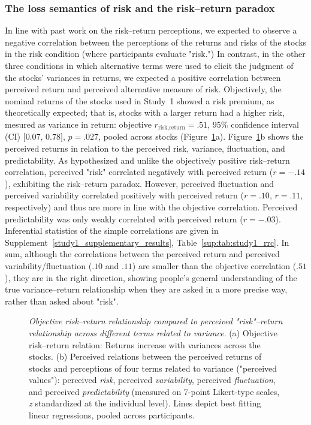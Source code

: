 \documentclass[a4paper,man, natbib,floatsintext]{apa6} %
\begin{document}
\subsubsection{The loss semantics of risk and the risk--return paradox}
In line with past work on the risk--return perceptions, we expected to observe a negative correlation between the perceptions of the returns and risks of the stocks in the risk condition (where participants evaluate "risk.") In contrast, in the other three conditions in which alternative terms were used to elicit the judgment of the stocks' variances in returns, we expected a positive correlation between perceived return and perceived alternative measure of risk. Objectively, the nominal returns of the stocks used in Study~1 showed a risk premium, as theoretically expected; that is, stocks with a larger return had a higher risk, mesured as variance in return: objective $r_{\text{risk,return}} = .51$, 95\% confidence interval (CI) $[0.07$, $0.78]$, $p = .027$, pooled across stocks (Figure~\ref{fig:rrc}a). Figure~\ref{fig:rrc}b shows the perceived returns in relation to the perceived risk, variance, fluctuation, and predictability. As hypothesized and unlike the objectively positive risk--return correlation, perceived "risk" correlated negatively with perceived return ($r = -.14$), exhibiting the risk--return paradox. However, perceived fluctuation and perceived variability correlated positively with perceived return ($r = .10$, $r = .11$, respectively) and thus are more in line with the objective correlation. Perceived predictability was only weakly correlated with perceived return ($r = -.03$). Inferential statistics of the simple correlations are given in Supplement~\ref{study1_supplementary_results}, Table~\ref{sup:tab:study1_rrc}. In sum, although the correlations between the perceived return and perceived variability/fluctuation ($.10$ and $.11$) are smaller than the objective correlation ($.51$), they are in the right direction, showing people's general understanding of the true variance--return relationship when they are asked in a more precise way, rather than asked about "risk". 
%
\begin{figure}[!htbp] 
 \centering
  \caption{\textit{Objective risk--return relationship compared to perceived "risk"--return relationship across different terms related to variance}. (a) Objective risk--return relation: Returns increase with variances across the stocks. (b) Perceived relations between the perceived returns of stocks and perceptions of four terms related to variance ("perceived values"): perceived \textit{risk}, perceived \textit{variability}, perceived \textit{fluctuation}, and perceived \textit{predictability} (measured on 7-point Likert-type scales, \textit{z} standardized at the individual level). Lines depict best fitting linear regressions, pooled across participants.}
  \label{fig:rrc}
\end{figure}
\end{document}
